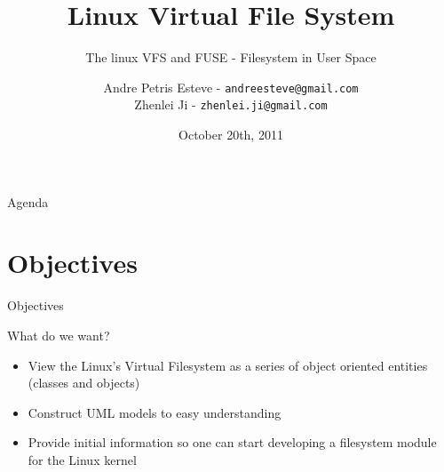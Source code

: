 \documentclass{beamer}
\author[Andre Esteve and Zhenlei Ji]{
Andre Petris Esteve - \texttt{andreesteve@gmail.com}\\
Zhenlei Ji - \texttt{zhenlei.ji@gmail.com}}
\institute[IC\textbackslash UNICAMP]{
MC806 - Operational System Topics\\}
\title[Linux VFS]{Linux Virtual File System}
\subtitle[]{The linux VFS and FUSE - Filesystem in User Space}
\date[10/20/2011]{October 20th, 2011}
\begin{document}

\begin{frame}[plain]
  \titlepage
\end{frame}

\begin{frame}{Agenda}
  \tableofcontents[hidesubsections]
\end{frame}

\section{Objectives}

\begin{frame}{Objectives}

  \begin{block}{What do we want?}

	\begin{itemize}[<+->]

		\item{View the Linux's Virtual Filesystem as a series of object oriented entities (classes and objects)}\footnotemark

		\item{Construct UML models to easy understanding}
		
		\item{Provide initial information so one can start developing a filesystem module for the Linux kernel}
	
	\end{itemize}

  \end{block}


\end{frame}
\end{document}
